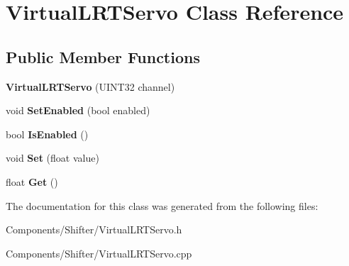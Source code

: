 \hypertarget{class_virtual_l_r_t_servo}{
\section{\-Virtual\-L\-R\-T\-Servo \-Class \-Reference}
\label{class_virtual_l_r_t_servo}
}
\subsection*{\-Public \-Member \-Functions}
\begin{DoxyCompactItemize}
\item 
\hypertarget{class_virtual_l_r_t_servo_a85a68f9b3706d3934bcdc6bd0a68eb24}{
{\bfseries \-Virtual\-L\-R\-T\-Servo} (\-U\-I\-N\-T32 channel)}
\label{class_virtual_l_r_t_servo_a85a68f9b3706d3934bcdc6bd0a68eb24}

\item 
\hypertarget{class_virtual_l_r_t_servo_ae6eb2bf258f25df7321908c5cbfee1a4}{
void {\bfseries \-Set\-Enabled} (bool enabled)}
\label{class_virtual_l_r_t_servo_ae6eb2bf258f25df7321908c5cbfee1a4}

\item 
\hypertarget{class_virtual_l_r_t_servo_a6e14202124a419bd5380fdabaa07bbe0}{
bool {\bfseries \-Is\-Enabled} ()}
\label{class_virtual_l_r_t_servo_a6e14202124a419bd5380fdabaa07bbe0}

\item 
\hypertarget{class_virtual_l_r_t_servo_a6ff178f79ecbe3085d0f28617d5b38c1}{
void {\bfseries \-Set} (float value)}
\label{class_virtual_l_r_t_servo_a6ff178f79ecbe3085d0f28617d5b38c1}

\item 
\hypertarget{class_virtual_l_r_t_servo_ac07500b5ecfb73c93f3fa8174457e2b3}{
float {\bfseries \-Get} ()}
\label{class_virtual_l_r_t_servo_ac07500b5ecfb73c93f3fa8174457e2b3}

\end{DoxyCompactItemize}


\-The documentation for this class was generated from the following files\-:\begin{DoxyCompactItemize}
\item 
\-Components/\-Shifter/\-Virtual\-L\-R\-T\-Servo.\-h\item 
\-Components/\-Shifter/\-Virtual\-L\-R\-T\-Servo.\-cpp\end{DoxyCompactItemize}
